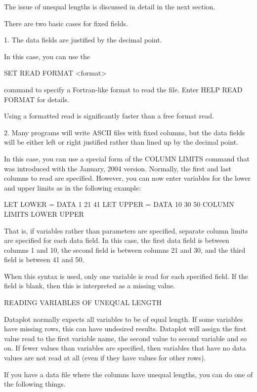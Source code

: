       The issue of unequal lengths is discussed in detail in the
      next section.

There are two basic cases for fixed fields.

   1. The data fields are justified by the decimal point.

      In this case, you can use the 

          SET READ FORMAT  <format>

      command to specify a Fortran-like format to read the file.
      Enter HELP READ FORMAT for details.

      Using a formatted read is significantly faster than a
      free format read.

   2. Many programs will write ASCII files with fixed columns,
      but the data fields will be either left or right justified
      rather than lined up by the decimal point.

      In this case, you can use a special form of the
      COLUMN LIMITS command that was introduced with the
      January, 2004 version.  Normally, the first and last columns
      to read are specified.  However, you can now enter variables for
      the lower and upper limits as in the following example:

         LET LOWER = DATA  1  21   41
         LET UPPER = DATA 10  30   50
         COLUMN LIMITS LOWER UPPER

      That is, if variables rather than parameters are specified,
      separate column limits are specified for each data field.
      In this case, the first data field is between columns
      1 and 10, the second field is between columns 21 and 30, and
      the third field is between 41 and 50.

      When this syntax is used, only one variable is read for
      each specified field.  If the field is blank, then this is
      interpreted as a missing value.


READING VARIABLES OF UNEQUAL LENGTH

Dataplot normally expects all variables to be of equal length.
If some variables have missing rows, this can have undesired
results.  Dataplot will assign the first value read to the
first variable name, the second value to second variable and
so on.  If fewer values than variables are specified, then variables
that have no data values are not read at all (even if they have
values for other rows).

If you have a data file where the columns have unequal lengths,
you can do one of the following things.

